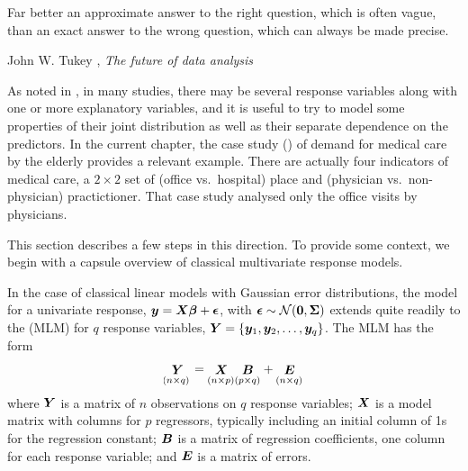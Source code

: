 \documentclass[11pt]{book}\usepackage[]{graphicx}\usepackage[]{color}
\begin{document}
\epigraph{Far better an approximate answer to the right question,
which is often vague, than an exact answer to the wrong question,
which can always be made precise.}{John W. Tukey \citeyearpar{Tukey:1962}, \emph{The future of data analysis}}


As noted in , in many studies, there may be 
several response variables along with one or more explanatory variables,
and it is useful to try to model some properties
of their joint distribution as well as their separate dependence on
the predictors.  
In the current chapter, the case study ()
of demand for medical care by the elderly provides a relevant example.
There are actually four indicators of medical care, a $2 \times 2$ set of
(office vs.\ hospital) place and (physician vs.\ non-physician) practictioner.
That case study analysed only the office visits by physicians.

This section describes a few steps in this direction.  To provide some context,
we begin with a capsule overview of classical multivariate response models.

In the case of classical linear models with Gaussian error distributions, the
model for a univariate response, $\bm{y} = \bm{X} \bm{\beta} + \bm{\epsilon}$,
with 
$\bm{\epsilon} \sim \mathcal{N} (\bm{0}, \bm{\Sigma})$
extends quite readily to the  (MLM) for $q$ response variables,
$\bm{Y} = \{ \bm{y}_1, \bm{y}_2, \dots , \bm{y}_q \}$.  The MLM has the form
\begin{equation}\label{eq:mlm}
\mathord{\mathop{\bm{Y}}\limits_{(n\times q)}} = \mathord{\mathop{\bm{X}}\limits_{(n\times p)}} \mathord{\mathop{\bm{B}}\limits_{(p\times q)}} + 
\mathord{\mathop{\bm{E}}\limits_{(n\times q)}}
\end{equation}
where $\bm{Y}$ is a matrix of $n$ observations on $q$ response variables; $\bm{X}$ is a model matrix with columns for $p$ regressors, typically including an initial column of 1s for the regression constant;
$\bm{B}$ is a matrix of regression coefficients, one column for each response variable; and $\bm{E}$ is a matrix of errors. 
\end{document}
